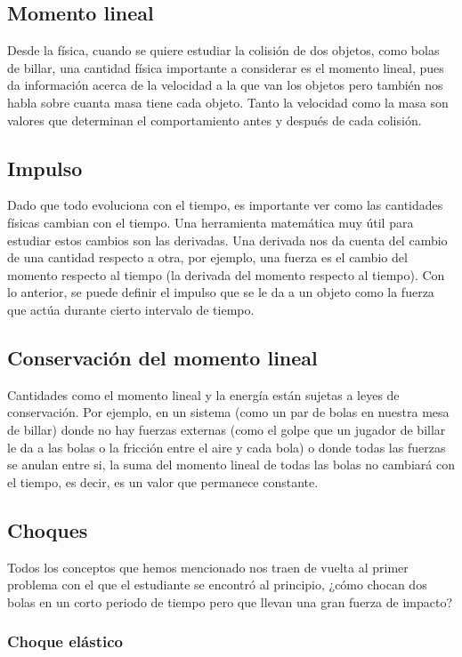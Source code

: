\documentclass{article}
\begin{document}
\subsection{Momento lineal}
Desde la física, cuando se quiere estudiar la colisión de dos objetos, como bolas de billar, una cantidad física importante a considerar es el momento lineal, pues da información acerca de la velocidad a la que van los objetos pero también nos habla sobre cuanta masa tiene cada objeto. Tanto la velocidad como la masa son valores que determinan el comportamiento antes y después de cada colisión.

\subsection{Impulso}
Dado que todo evoluciona con el tiempo, es importante ver como las cantidades físicas cambian con el tiempo. Una herramienta matemática muy útil para estudiar estos cambios son las derivadas. Una derivada nos da cuenta del cambio de una cantidad respecto a otra, por ejemplo, una fuerza es el cambio del momento respecto al tiempo (la derivada del momento respecto al tiempo). Con lo anterior, se puede definir el impulso que se le da a un objeto como la fuerza que actúa durante cierto intervalo de tiempo.

\subsection{Conservación del momento lineal}
Cantidades como el momento lineal y la energía están sujetas a leyes de conservación. Por ejemplo, en un sistema (como un par de bolas en nuestra mesa de billar) donde no hay fuerzas externas (como el golpe que un jugador de billar le da a las bolas o la fricción entre el aire y cada bola) o donde todas las fuerzas se anulan entre si, la suma del momento lineal de todas las bolas no cambiará con el tiempo, es decir, es un valor que permanece constante.

\subsection{Choques}

Todos los conceptos que hemos mencionado nos traen de vuelta al primer problema con el que el estudiante se encontró al principio, ¿cómo chocan dos bolas en un corto periodo de tiempo pero que llevan una gran fuerza de impacto?

\subsubsection{Choque elástico}
\end{document}
